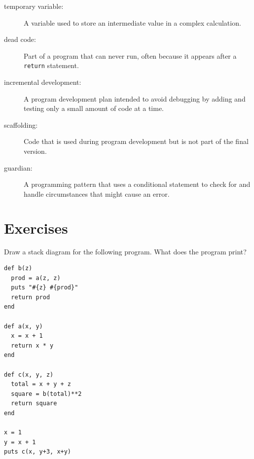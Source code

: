 \documentclass[10pt]{book}
\begin{document}
\begin{description}

\item[temporary variable:]  A variable used to store an intermediate value in
a complex calculation.

\item[dead code:]  Part of a program that can never run, often because
it appears after a {\tt return} statement.

\item[incremental development:]  A program development plan intended to
avoid debugging by adding and testing only
a small amount of code at a time.


\item[scaffolding:]  Code that is used during program development but is
not part of the final version.

\item[guardian:]  A programming pattern that uses a conditional
statement to check for and handle circumstances that
might cause an error.

\end{description}


\section{Exercises}

\begin{exercise}

Draw a stack diagram for the following program.  What does the program print?

\begin{verbatim}
def b(z)
  prod = a(z, z)
  puts "#{z} #{prod}"
  return prod
end

def a(x, y)
  x = x + 1
  return x * y
end

def c(x, y, z)
  total = x + y + z
  square = b(total)**2
  return square
end

x = 1
y = x + 1
puts c(x, y+3, x+y)
\end{verbatim}

\end{exercise}
\end{document}
